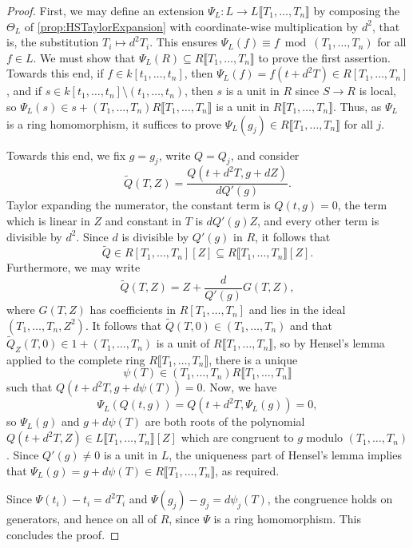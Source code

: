 \documentclass[11pt,leqno]{amsart}
\numberwithin{equation}{section}
\theoremstyle{definition}
\theoremstyle{remark}
\newcommand{\llb}{\llbracket}
\newcommand{\rrb}{\rrbracket}
\begin{document}
\begin{proof}
First, we may define an extension $\Psi_L: L \to L\llb T_1, \dots, T_n \rrb$ by composing the $\Theta_L$ of \cref{prop:HSTaylorExpansion} with coordinate-wise multiplication by $d^2$, that is, the substitution $T_i \mapsto d^2T_i$. This ensures $\Psi_L(f) \equiv f \bmod (T_1, \dots, T_n)$ for all $f \in L$. We must show that $\Psi_L(R) \subseteq R{\llb T_1, \dots, T_n \rrb}$ to prove the first assertion. Towards this end, if $f \in k[t_1, \dots, t_n]$, then $\Psi_L(f) = f(t + d^2T) \in R[T_1, \dots, T_n]$, and if $s \in k[t_1, \dots, t_n] \setminus (t_1, \dots, t_n)$, then $s$ is a unit in $R$ since $S \to R$ is local, so $\Psi_L(s) \in s + (T_1, \dots, T_n)R\llb T_1, \dots, T_n \rrb$ is a unit in $R \llb T_1, \dots, T_n \rrb$. Thus, as $\Psi_L$ is a ring homomorphism, it suffices to prove $\Psi_L(g_j) \in R\llb T_1, \dots, T_n \rrb$ for all $j$. 

Towards this end, we fix $g = g_j$, write $Q = Q_j$, and consider $$\tilde{Q}(T, Z) = \frac{Q(t + d^2T, g + dZ)}{dQ'(g)}.$$ Taylor expanding the numerator, the constant term is $Q(t, g) = 0$, the term which is linear in $Z$ and constant in $T$ is $dQ'(g)Z$, and every other term is divisible by $d^2$. Since $d$ is divisible by $Q'(g)$ in $R$, it follows that $$\tilde{Q} \in R[T_1, \dots, T_n][Z] \subseteq R\llb T_1, \dots, T_n \rrb[Z].$$ Furthermore, we may write $$\tilde{Q}(T, Z) = Z + \frac{d}{Q'(g)}G(T, Z),$$ where $G(T, Z)$ has coefficients in $R[T_1, \dots, T_n]$ and lies in the ideal $(T_1, \dots, T_n, Z^2)$. It follows that $\tilde{Q}(T, 0) \in (T_1, \dots, T_n)$ and that $\tilde{Q}_Z(T, 0) \in 1 + (T_1, \dots, T_n)$ is a unit of $R\llb T_1, \dots, T_n \rrb$, so by Hensel's lemma \cite[Theorem 7.3]{eisenbud95} applied to the complete ring $R\llb T_1, \dots, T_n \rrb$, there is a unique $$\psi(T) \in (T_1, \dots, T_n)R\llb T_1, \dots, T_n \rrb$$ such that $Q(t + d^2T, g + d\psi(T)) = 0$. Now, we have $$\Psi_L(Q(t, g)) = Q(t + d^2T, \Psi_L(g)) = 0,$$ so $\Psi_L(g)$ and $g + d\psi(T)$ are both roots of the polynomial $Q(t + d^2T, Z) \in L\llb T_1, \dots, T_n \rrb[Z]$ which are congruent to $g$ modulo $(T_1, \dots, T_n)$. Since $Q'(g) \neq 0$ is a unit in $L$, the uniqueness part of Hensel's lemma implies that $\Psi_L(g) = g + d\psi(T) \in R\llb T_1, \dots, T_n \rrb$, as required.

Since $\Psi(t_i)-t_i=d^2T_i$ and $\Psi(g_j)-g_j=d\psi_j(T)$, the congruence holds on generators, and hence on all of $R$, since $\Psi$ is a ring homomorphism. This concludes the proof.
\end{proof}
\end{document}
